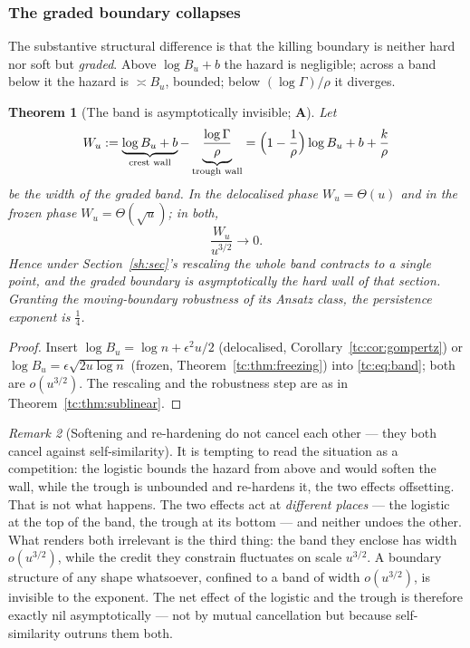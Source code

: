 \documentclass[11pt]{article}
\numberwithin{equation}{section}
\theoremstyle{plain}
\newtheorem{theorem}{Theorem}[section]
\theoremstyle{definition}
\theoremstyle{remark}
\newtheorem{remark}[theorem]{Remark}
\begin{document}
\subsubsection{The graded boundary collapses}\label{tc:subsub:collapse}

The substantive structural difference is that the killing boundary is
neither hard nor soft but \emph{graded}. Above $\log B_u+b$ the hazard
is negligible; across a band below it the hazard is $\asymp B_u$,
bounded; below $(\log\Gamma)/\rho$ it diverges.

\begin{theorem}[The band is asymptotically invisible; \textbf{A}]
\label{tc:thm:collapse}
Let
\begin{equation}\label{tc:eq:band}
W_u:=\underbrace{\log B_u+b}_{\text{crest wall}}
-\underbrace{\frac{\log\Gamma}{\rho}}_{\text{trough wall}}
=\Bigl(1-\frac1\rho\Bigr)\log B_u+b+\frac{k}{\rho}
\end{equation}
be the width of the graded band. In the delocalised phase
$W_u=\Theta(u)$ and in the frozen phase $W_u=\Theta(\sqrt u)$; in both,
\[
\frac{W_u}{u^{3/2}}\longrightarrow0 .
\]
Hence under Section~\ref{sh:sec}'s rescaling the whole band contracts to a single
point, and the graded boundary is asymptotically the hard wall of that
section. Granting the moving-boundary robustness of its Ansatz class,
the persistence exponent is $\tfrac14$.
\end{theorem}

\begin{proof}
Insert $\log B_u=\log n+\epsilon^{2}u/2$ (delocalised,
Corollary~\ref{tc:cor:gompertz}) or
$\log B_u=\epsilon\sqrt{2u\log n}$ (frozen,
Theorem~\ref{tc:thm:freezing}) into \eqref{tc:eq:band}; both are
$o(u^{3/2})$. The rescaling and the robustness step are as in
Theorem~\ref{tc:thm:sublinear}.
\end{proof}

\begin{remark}[Softening and re-hardening do not cancel each other ---
they both cancel against self-similarity]\label{tc:rem:netcancel}
It is tempting to read the situation as a competition: the logistic
bounds the hazard from above and would soften the wall, while the trough
is unbounded and re-hardens it, the two effects offsetting. That is not
what happens. The two effects act at \emph{different places} --- the
logistic at the top of the band, the trough at its bottom --- and
neither undoes the other. What renders both irrelevant is the third
thing: the band they enclose has width $o(u^{3/2})$, while the credit
they constrain fluctuates on scale $u^{3/2}$. A boundary structure of
any shape whatsoever, confined to a band of width $o(u^{3/2})$, is
invisible to the exponent. The net effect of the logistic and the trough
is therefore exactly nil asymptotically --- not by mutual cancellation
but because self-similarity outruns them both.
\end{remark}
\end{document}
